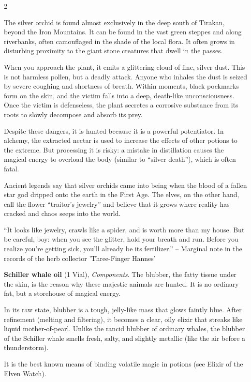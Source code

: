 \begin{multicols}{2}
\begin{denseitemize}
The silver orchid is found almost exclusively in the deep south of Tirakan, beyond the Iron Mountains. It can be found in the vast green steppes and along riverbanks, often camouflaged in the shade of the local flora. It often grows in disturbing proximity to the giant stone creatures that dwell in the passes.

When you approach the plant, it emits a glittering cloud of fine, silver dust. This is not harmless pollen, but a deadly attack. Anyone who inhales the dust is seized by severe coughing and shortness of breath. Within moments, black pockmarks form on the skin, and the victim falls into a deep, death-like unconsciousness. Once the victim is defenseless, the plant secretes a corrosive substance from its roots to slowly decompose and absorb its prey.

Despite these dangers, it is hunted because it is a powerful potentiator. In alchemy, the extracted nectar is used to increase the effects of other potions to the extreme. But processing it is risky: a mistake in distillation causes the magical energy to overload the body (similar to “silver death”), which is often fatal.

Ancient legends say that silver orchids came into being when the blood of a fallen star god dripped onto the earth in the First Age. The elves, on the other hand, call the flower “traitor's jewelry” and believe that it grows where reality has cracked and chaos seeps into the world.

“It looks like jewelry, crawls like a spider, and is worth more than my house. But be careful, boy: when you see the glitter, hold your breath and run. Before you realize you're getting sick, you'll already be its fertilizer.” – Marginal note in the records of the herb collector 'Three-Finger Hannes'
        \item \textbf{Schiller whale oil} (1 Vial), \textit{Components}.
        The blubber, the fatty tissue under the skin, is the reason why these majestic animals are hunted. It is no ordinary fat, but a storehouse of magical energy.

In its raw state, blubber is a tough, jelly-like mass that glows faintly blue. After refinement (melting and filtering), it becomes a clear, oily elixir that streaks like liquid mother-of-pearl.
Unlike the rancid blubber of ordinary whales, the blubber of the Schiller whale smells fresh, salty, and slightly metallic (like the air before a thunderstorm).

It is the best known means of binding volatile magic in potions (see Elixir of the Elven Watch).


\end{denseitemize}
\end{multicols}
